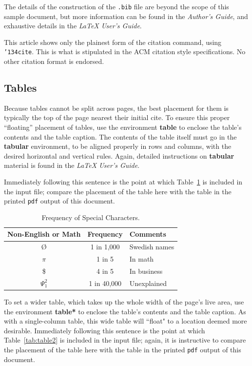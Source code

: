 \documentclass[article,english]{stucosrec}
\newcommand{\latex}{\LaTeX\xspace}
\begin{document}
	The details of the construction of the \texttt{.bib} file are beyond the scope of this sample document, but more information can be found in the \textit{Author's Guide}, and exhaustive details in the \textit{\latex User's Guide}\cite{Lamport:LaTeX}.
	
	This article shows only the plainest form of the citation command, using \texttt{{\char'134}cite}.
	This is what is stipulated in the ACM citation style specifications.
	No other citation format is endorsed.
	
	\subsection{Tables}
	
	Because tables cannot be split across pages, the best placement for them is typically the top of the page nearest their initial cite.
	To ensure this proper ``floating'' placement of tables, use the environment \textbf{table} to enclose the table's contents and the table caption.
	The contents of the table itself must go in the \textbf{tabular} environment, to be aligned properly in rows and columns, with the desired horizontal and vertical rules.
	Again, detailed instructions on \textbf{tabular} material is found in the \textit{\latex User's Guide}.
	
	Immediately following this sentence is the point at which Table~\ref{tab:table1} is included in the input file; compare the placement of the table here with the table in the printed \texttt{pdf} output of this document.
	
	\begin{table}
		\centering
		\caption{Frequency of Special Characters.}
		\label{tab:table1}
		\begin{tabular}{|c|c|l|} \hline
			Non-English or Math&Frequency&Comments\\ \hline
			\O & 1 in 1,000& Swedish names\\ \hline
			$\pi$ & 1 in 5& In math\\ \hline
			\$ & 4 in 5 & In business\\ \hline
			$\Psi^2_1$ & 1 in 40,000& Unexplained \\ \hline
		\end{tabular}
	\end{table}

	To set a wider table, which takes up the whole width of the page's live area, use the environment \textbf{table*} to enclose the table's contents and the table caption.
	As with a single-column table, this wide table will ``float" to a location deemed more desirable.
	Immediately following this sentence is the point at which Table~\ref{tab:table2} is included in the input file; again, it is instructive to compare the placement of the table here with the table in the printed \texttt{pdf} output of this document.
	
\end{document}
